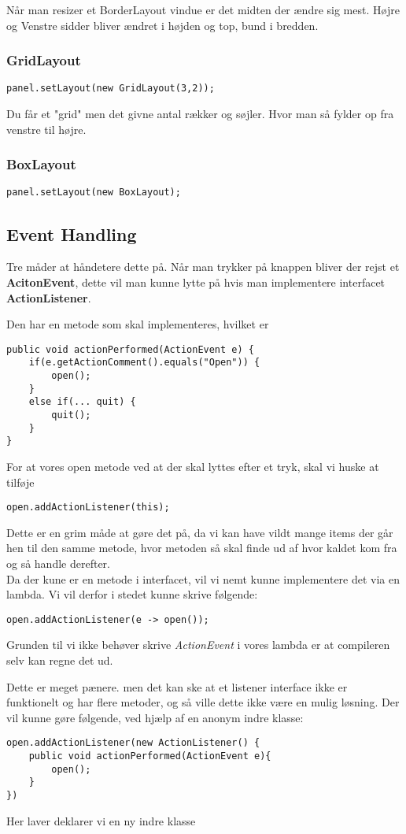 \documentclass{article}
\begin{document}
Når man resizer et BorderLayout vindue er det midten der ændre sig mest. Højre og Venstre sidder bliver ændret i højden og top, bund i bredden.

\subsubsection*{GridLayout}
\begin{verbatim}
panel.setLayout(new GridLayout(3,2));
\end{verbatim}
Du får et "grid" men det givne antal rækker og søjler. Hvor man så fylder op fra venstre til højre.

\subsubsection*{BoxLayout}
\begin{verbatim}
panel.setLayout(new BoxLayout);
\end{verbatim}

\subsection*{Event Handling}
Tre måder at håndetere dette på. Når man trykker på knappen bliver der rejst et \textbf{AcitonEvent}, dette vil man kunne lytte på hvis man implementere interfacet \textbf{ActionListener}.

Den har en metode som skal implementeres, hvilket er
\begin{verbatim}
public void actionPerformed(ActionEvent e) {
    if(e.getActionComment().equals("Open")) {
        open();
    }
    else if(... quit) {
        quit();
    }
}
\end{verbatim}

For at vores open metode ved at der skal lyttes efter et tryk, skal vi huske at tilføje
\begin{verbatim}
open.addActionListener(this);
\end{verbatim}

Dette er en grim måde at gøre det på, da vi kan have vildt mange items der går hen til den samme metode, hvor metoden så skal finde ud af hvor kaldet kom fra og så handle derefter. \\

Da der kune er en metode i interfacet, vil vi nemt kunne implementere det via en lambda. Vi vil derfor i stedet kunne skrive følgende:
\begin{verbatim}
open.addActionListener(e -> open()); 
\end{verbatim}
Grunden til vi ikke behøver skrive \textit{ActionEvent} i vores lambda er at compileren selv kan regne det ud.

Dette er meget pænere. men det kan ske at et listener interface ikke er funktionelt og har flere metoder, og så ville dette ikke være en mulig løsning. Der vil kunne gøre følgende, ved hjælp af en anonym indre klasse:

\begin{verbatim}
open.addActionListener(new ActionListener() {
    public void actionPerformed(ActionEvent e){
        open();
    }
})
\end{verbatim}
Her laver deklarer vi en ny indre klasse
\end{document}

